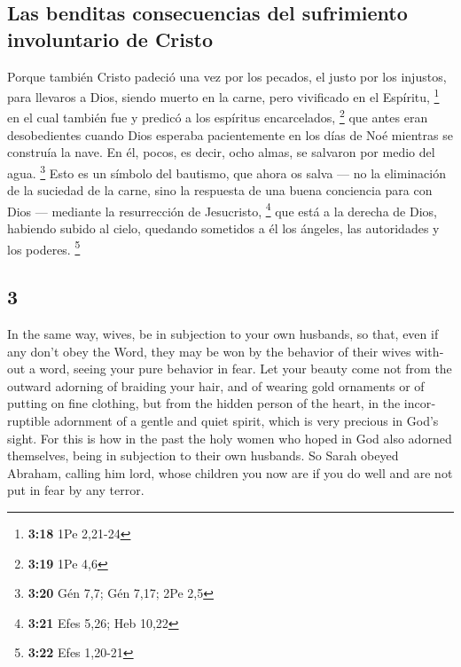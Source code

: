 \begin{paracol}{2}
\hypertarget{las-benditas-consecuencias-del-sufrimiento-involuntario-de-cristo}{%
\subsection{Las benditas consecuencias del sufrimiento involuntario de
Cristo}\label{las-benditas-consecuencias-del-sufrimiento-involuntario-de-cristo}}

 Porque también Cristo padeció una vez por los pecados,
el justo por los injustos, para llevaros a Dios, siendo muerto en la
carne, pero vivificado en el Espíritu, \footnote{\textbf{3:18} 1Pe
  2,21-24}  en el cual también fue y predicó a los
espíritus encarcelados, \footnote{\textbf{3:19} 1Pe 4,6} 
que antes eran desobedientes cuando Dios esperaba pacientemente en los
días de Noé mientras se construía la nave. En él, pocos, es decir, ocho
almas, se salvaron por medio del agua. \footnote{\textbf{3:20} Gén 7,7;
  Gén 7,17; 2Pe 2,5}  Esto es un símbolo del bautismo,
que ahora os salva --- no la eliminación de la suciedad de la carne,
sino la respuesta de una buena conciencia para con Dios --- mediante la
resurrección de Jesucristo, \footnote{\textbf{3:21} Efes 5,26; Heb 10,22}
 que está a la derecha de Dios, habiendo subido al cielo,
quedando sometidos a él los ángeles, las autoridades y los poderes.
\footnote{\textbf{3:22} Efes 1,20-21}

\switchcolumn
\begin{otherlanguage}{english}

\hypertarget{section-5}{%
\section{3}\label{section-5}}

 In the same way, wives, be in subjection to your own
husbands, so that, even if any don't obey the Word, they may be won by
the behavior of their wives without a word,  seeing your
pure behavior in fear.  Let your beauty come not from the
outward adorning of braiding your hair, and of wearing gold ornaments or
of putting on fine clothing,  but from the hidden person
of the heart, in the incorruptible adornment of a gentle and quiet
spirit, which is very precious in God's sight.  For this
is how in the past the holy women who hoped in God also adorned
themselves, being in subjection to their own husbands.  So
Sarah obeyed Abraham, calling him lord, whose children you now are if
you do well and are not put in fear by any terror.


\end{otherlanguage}
\end{paracol}
